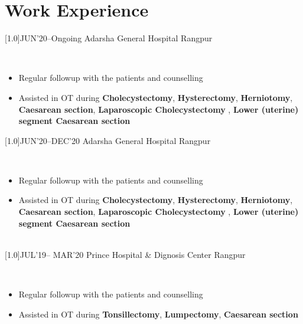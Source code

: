 \documentclass[english]{cv-style}     %
\begin{document}
\section{Work Experience}
  \vspace{-0.2cm}
\begin{entrylist}
\vspace{-0.3cm}
\entry
  {\scalebox{.8}[1.0]{JUN'20--Ongoing}}
  {Adarsha General Hospital}
  {Rangpur}
  {\\
    \vspace{-0.3cm}
  \begin{itemize}[leftmargin=*, label=\guillemotright]
      \item Regular followup with the patients and counselling
      \item Assisted in OT during \textbf{Cholecystectomy},  \textbf{Hysterectomy}, \textbf{ Herniotomy}, \textbf{ Caesarean section}, \textbf{Laparoscopic Cholecystectomy }, \textbf{Lower (uterine) segment Caesarean section}
  \end{itemize}
 

\entry
  {\scalebox{.8}[1.0]{JUN'20--DEC'20}}
  {Adarsha General Hospital}
  {Rangpur}
  {\\
    \vspace{-0.3cm}
  \begin{itemize}[leftmargin=*, label=\guillemotright]
      \item Regular followup with the patients and counselling
      \item Assisted in OT during \textbf{Cholecystectomy},  \textbf{Hysterectomy}, \textbf{ Herniotomy}, \textbf{ Caesarean section}, \textbf{Laparoscopic Cholecystectomy }, \textbf{Lower (uterine) segment Caesarean section}
  \end{itemize}
 

}\\
\vspace{-0.3cm}
\entry
  {\scalebox{.8}[1.0]{JUL'19-- MAR'20}}
  {Prince Hospital \& Dignosis Center}
  {Rangpur}
  {\\
    \vspace{-0.3cm}
  \begin{itemize}[leftmargin=*, label=\guillemotright]
      \item Regular followup with the patients and counselling
      \item Assisted in OT during \textbf{Tonsillectomy},  \textbf{Lumpectomy}, \textbf{ Caesarean section}
  \end{itemize}
 

}}
\end{entrylist}
\end{document}
